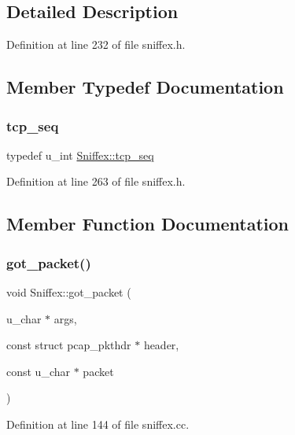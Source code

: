 \subsection{Detailed Description}


Definition at line 232 of file sniffex.\+h.



\subsection{Member Typedef Documentation}
\mbox{\label{class_sniffex_a83629f6a3ec687dd2bb381e9bf157d4f}} 
\subsubsection{\texorpdfstring{tcp\+\_\+seq}{tcp\_seq}}
{\footnotesize\ttfamily typedef u\+\_\+int \hyperlink{class_sniffex_a83629f6a3ec687dd2bb381e9bf157d4f}{Sniffex\+::tcp\+\_\+seq}}



Definition at line 263 of file sniffex.\+h.



\subsection{Member Function Documentation}
\mbox{\label{class_sniffex_a3d4ef3c90e55035eadca2d577004cd14}} 
\subsubsection{\texorpdfstring{got\+\_\+packet()}{got\_packet()}}
{\footnotesize\ttfamily void Sniffex\+::got\+\_\+packet (\begin{DoxyParamCaption}\item[{u\+\_\+char $\ast$}]{args,  }\item[{const struct pcap\+\_\+pkthdr $\ast$}]{header,  }\item[{const u\+\_\+char $\ast$}]{packet }\end{DoxyParamCaption})}



Definition at line 144 of file sniffex.\+cc.


